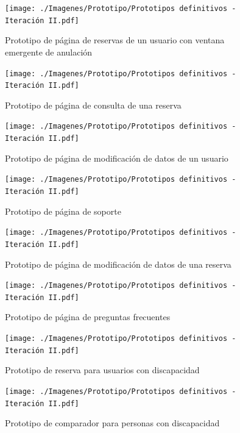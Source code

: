 \begin{figure}[H]
    \centering
    \texttt{[image: ./Imagenes/Prototipo/Prototipos definitivos - Iteración II.pdf]}
    \caption{Prototipo de página de reservas de un usuario con ventana emergente de anulación}
    \label{fig:prot2_reservas_usuario_popup}
\end{figure}

\begin{figure}[H]
      \centering
      \texttt{[image: ./Imagenes/Prototipo/Prototipos definitivos - Iteración II.pdf]}
      \caption{Prototipo de página de consulta de una reserva}
      \label{fig:prot2_reservas_mod}
\end{figure}

\begin{figure}[H]
    \centering
    \texttt{[image: ./Imagenes/Prototipo/Prototipos definitivos - Iteración II.pdf]}
    \caption{Prototipo de página de modificación de datos de un usuario}
    \label{fig:prot2_usuario_mod}
\end{figure}

\begin{figure}[H]
    \centering
    \texttt{[image: ./Imagenes/Prototipo/Prototipos definitivos - Iteración II.pdf]}
    \caption{Prototipo de página de soporte}
    \label{fig:prot2_soporte}
\end{figure}

\begin{figure}[H]
    \centering
    \texttt{[image: ./Imagenes/Prototipo/Prototipos definitivos - Iteración II.pdf]}
    \caption{Prototipo de página de modificación de datos de una reserva}
    \label{fig:prot2_reserva_mod}
\end{figure}

\begin{figure}[H]
    \centering
    \texttt{[image: ./Imagenes/Prototipo/Prototipos definitivos - Iteración II.pdf]}
    \caption{Prototipo de página de preguntas frecuentes}
    \label{fig:prot2_faq}
\end{figure}

\begin{figure}[H]
    \centering
    \texttt{[image: ./Imagenes/Prototipo/Prototipos definitivos - Iteración II.pdf]}
    \caption{Prototipo de reserva para usuarios con discapacidad}
    \label{fig:prot2_reserva_dis}
\end{figure}

\begin{figure}[H]
    \centering
    \texttt{[image: ./Imagenes/Prototipo/Prototipos definitivos - Iteración II.pdf]}
    \caption{Prototipo de comparador para personas con discapacidad}
    \label{fig:prot2_comp_dis}
\end{figure}

